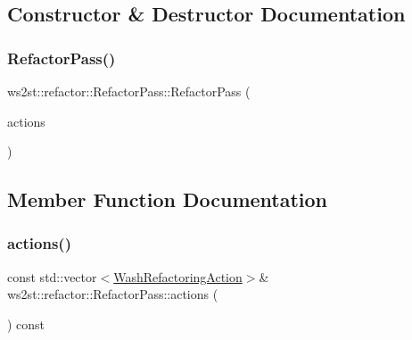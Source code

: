 \subsection{Constructor \& Destructor Documentation}
\mbox{\label{classws2st_1_1refactor_1_1RefactorPass_a2e7cff9227709e40ebda3cb4acfc8fb4}} 
\subsubsection{\texorpdfstring{Refactor\+Pass()}{RefactorPass()}}
{\footnotesize\ttfamily ws2st\+::refactor\+::\+Refactor\+Pass\+::\+Refactor\+Pass (\begin{DoxyParamCaption}\item[{std\+::initializer\+\_\+list$<$ std\+::variant$<$ std\+::vector$<$ std\+::string $>$ $\ast$, \mbox{\hyperlink{classws2st_1_1refactor_1_1WashRefactoringAction}{Wash\+Refactoring\+Action}}, \mbox{\hyperlink{classws2st_1_1refactor_1_1WashComputationAction}{Wash\+Computation\+Action}} $>$$>$}]{actions }\end{DoxyParamCaption})\hspace{0.3cm}{\ttfamily [inline]}}



\subsection{Member Function Documentation}
\mbox{\label{classws2st_1_1refactor_1_1RefactorPass_a349d409f7570c2516f690b8fe17ad20f}} 
\subsubsection{\texorpdfstring{actions()}{actions()}}
{\footnotesize\ttfamily const std\+::vector$<$\mbox{\hyperlink{classws2st_1_1refactor_1_1WashRefactoringAction}{Wash\+Refactoring\+Action}}$>$\& ws2st\+::refactor\+::\+Refactor\+Pass\+::actions (\begin{DoxyParamCaption}{ }\end{DoxyParamCaption}) const\hspace{0.3cm}{\ttfamily [inline]}}

